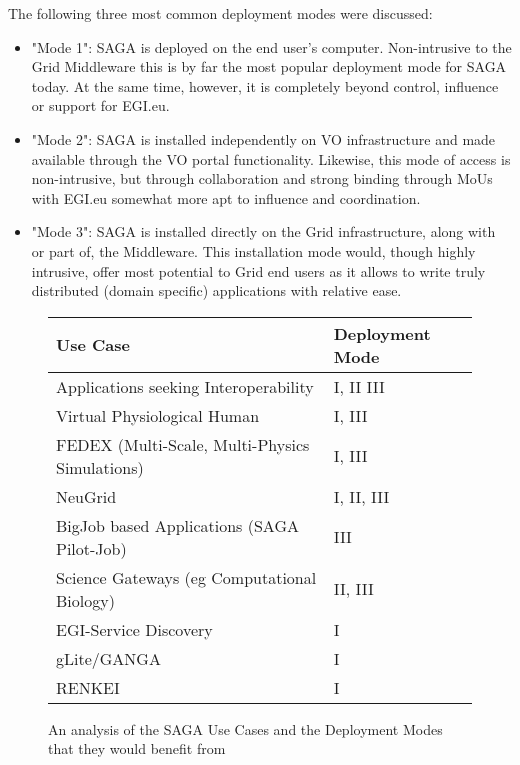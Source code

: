 \documentclass[10pt,conference,final,letterpaper,twoside,twocolumn,]{IEEEtran}
\begin{document}
The following three most common deployment modes were discussed:

\begin{itemize}

\item "Mode 1": SAGA is deployed on the end user's
  computer. Non-intrusive to the Grid Middleware this is by far the
  most popular deployment mode for SAGA today. At the same time,
  however, it is completely beyond control, influence or support for
  EGI.eu.

\item "Mode 2": SAGA is installed independently on VO infrastructure
  and made available through the VO portal functionality. Likewise,
  this mode of access is non-intrusive, but through collaboration and
  strong binding through MoUs with EGI.eu somewhat more apt to
  influence and coordination.

\item "Mode 3": SAGA is installed directly on the Grid infrastructure,
  along with or part of, the Middleware. This installation mode would,
  though highly intrusive, offer most potential to Grid end users as
  it allows to write truly distributed (domain specific) applications
  with relative ease.

\end{itemize}

\begin{figure}[t]
\centering
\begin{tabular}{ll}
Use Case & Deployment Mode \\
\hline
Applications seeking Interoperability & I, II III \\
Virtual Physiological Human & I, III\\
FEDEX (Multi-Scale, Multi-Physics Simulations)  & I, III\\
NeuGrid  & I, II, III\\
BigJob based Applications (SAGA Pilot-Job)  &  III\\
Science Gateways (eg Computational Biology)  & II, III \\
EGI-Service Discovery  & I\\
gLite/GANGA  & I \\
RENKEI  & I\\
\hline
\end{tabular}
\caption{An analysis of the SAGA Use Cases and the Deployment Modes
  that they would benefit from}
\end{figure}

  
\end{document}
